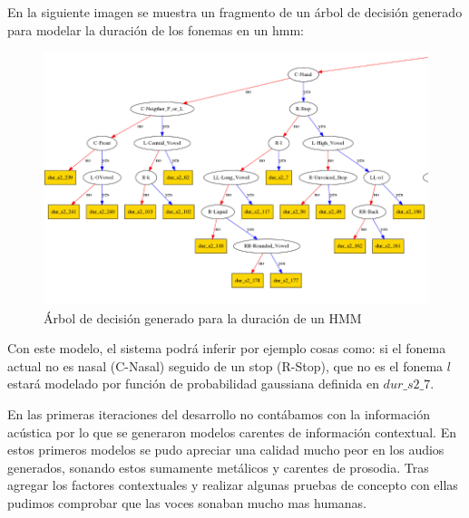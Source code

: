 En la siguiente imagen se muestra un fragmento de un árbol de decisión generado para modelar la duración de los fonemas en un hmm:

\begin{figure}
\begin{center}
\includegraphics[scale=0.4]{imagenes/arbolDeDesicionTesis.png}
\caption{Árbol de decisión generado para la duración de un HMM}
\end{center}
\end{figure}

Con este modelo, el sistema podrá inferir por ejemplo cosas como: si el fonema actual no es nasal (C-Nasal) seguido de un stop (R-Stop), que no es el fonema $l$ estará modelado por función de probabilidad gaussiana definida en $dur\_s2\_7$.

En las primeras iteraciones del desarrollo no contábamos con la información acústica por lo que se generaron modelos carentes de información contextual. En estos primeros modelos se pudo apreciar una calidad mucho peor en los audios generados, sonando estos sumamente metálicos y carentes de prosodia. Tras agregar los factores contextuales y realizar algunas pruebas de concepto con ellas pudimos comprobar que las voces sonaban mucho mas humanas.


